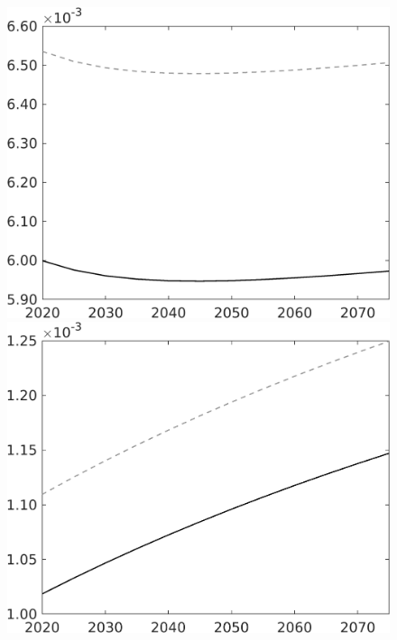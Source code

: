 \documentclass[12pt]{article}
\begin{document}
\begin{figure}[h!!]
\begin{minipage}[]{0.32\textwidth}
	\end{minipage}	
	\begin{minipage}[]{0.32\textwidth}
		\includegraphics[width=1\textwidth]{../../codding_model/own_basedOnFried/optimalPol_010922_revision/figures/all_13Sept22/CompTaul_LFBAU_Reg0_Lf_spillover0_nsk1_xgr0_knspil0_sep1_countec0_GovRev0_etaa0.79_lgd0.png}
	\end{minipage}	
	\begin{minipage}[]{0.32\textwidth}
		\includegraphics[width=1\textwidth]{../../codding_model/own_basedOnFried/optimalPol_010922_revision/figures/all_13Sept22/CompTaul_LFBAU_Reg0_Lg_spillover0_nsk1_xgr0_knspil0_sep1_countec0_GovRev0_etaa0.79_lgd0.png}

\end{minipage}
\end{figure}
\end{document}
